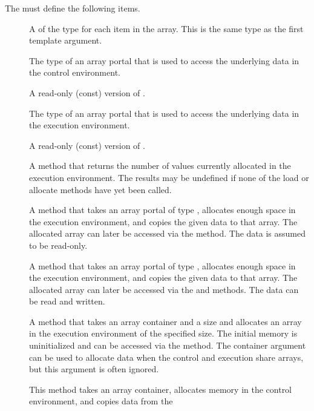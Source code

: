 The  must define the following items.
\begin{description}
\item[] A  of the type for each item
  in the array. This is the same type as the first template argument.
\item[] The type of an array portal that is used to
  access the underlying data in the control environment.
\item[] A read-only (const) version of
  .
\item[] The type of an array portal that is used
  to access the underlying data in the execution environment.
\item[] A read-only (const) version of
  .
\item[] A method that returns the number of
  values currently allocated in the execution environment. The results may
  be undefined if none of the load or allocate methods have yet been
  called.
\item[] A method that takes an array portal of
  type , allocates enough space in the
  execution environment, and copies the given data to that array. The
  allocated array can later be accessed via the 
  method. The data is assumed to be read-only.
\item[] A method that takes an array portal of
  type , allocates enough space in the execution
  environment, and copies the given data to that array. The allocated array
  can later be accessed via the  and
   methods. The data can be read and written.
\item[] A method that takes an array
  container and a size and allocates an array in the execution environment
  of the specified size. The initial memory is uninitialized and can be
  accessed via the  method. The container argument can
  be used to allocate data when the control and execution share arrays, but
  this argument is often ignored.
\item[] This method takes an array container,
  allocates memory in the control environment, and copies data from the

\end{description}
